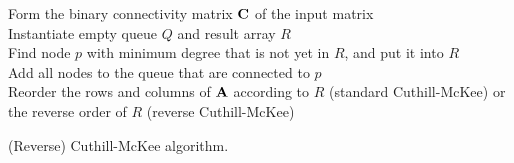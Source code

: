 \begin{algorithm}

Form the binary connectivity matrix $\mathbf{C}$ of the input matrix
\\
Instantiate empty queue $Q$ and result array $R$
\\
 {
	Find node $p$ with minimum degree that is not yet in $R$, and put it into $R$
	\\
	Add all nodes to the queue that are connected to $p$
	\\
} %
Reorder the rows and columns of $\mathbf{A}$ according to $R$ (standard Cuthill-McKee) or the reverse order of $R$ (reverse Cuthill-McKee)

\caption{(Reverse) Cuthill-McKee algorithm.}
\label{algo:CM}
\end{algorithm}


